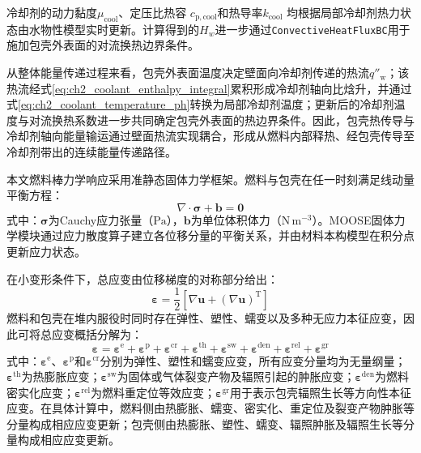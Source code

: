 冷却剂的动力黏度$\mu_{\mathrm{cool}}$、定压比热容
$c_{\mathrm p,\mathrm{cool}}$和热导率$k_{\mathrm{cool}}$
均根据局部冷却剂热力状态由水物性模型实时更新。计算得到的$H_w$进一步通过\texttt{ConvectiveHeatFluxBC}用于施加包壳外表面的对流换热边界条件。

从整体能量传递过程来看，包壳外表面温度决定壁面向冷却剂传递的热流$q''_{\mathrm w}$；该热流经式\eqref{eq:ch2_coolant_enthalpy_integral}累积形成冷却剂轴向比{\rarecharfont 焓}升，并通过式\eqref{eq:ch2_coolant_temperature_ph}转换为局部冷却剂温度；更新后的冷却剂温度与对流换热系数进一步共同确定包壳外表面的热边界条件。因此，包壳热传导与冷却剂轴向能量输运通过壁面热流实现耦合，形成从燃料内部释热、经包壳传导至冷却剂带出的连续能量传递路径。

\label{sec:ch2_mechanics_governing}


本文燃料棒力学响应采用准静态固体力学框架。燃料与包壳在任一时刻满足线动量平衡方程：
\begin{equation}
	\nabla\cdot\boldsymbol{\sigma}+\mathbf b=\mathbf 0
	\label{eq:ch2_quasistatic_equilibrium}
\end{equation}
\noindent 式中：$\boldsymbol{\sigma}$为Cauchy应力张量（$\mathrm{Pa}$），$\mathbf b$为单位体积体力（$\mathrm{N\,m^{-3}}$）。MOOSE固体力学模块通过应力散度算子建立各位移分量的平衡关系，并由材料本构模型在积分点更新应力状态\cite{halesBISONTheoryManual2016}。

在小变形条件下，总应变由位移梯度的对称部分给出：
\begin{equation}
	\boldsymbol{\varepsilon}
	=\frac{1}{2}
	\left[
		\nabla\mathbf u+\left(\nabla\mathbf u\right)^{\mathrm T}
		\right]
	\label{eq:ch2_small_strain}
\end{equation}
燃料和包壳在堆内服役时同时存在弹性、塑性、蠕变以及多种无应力本征应变，因此可将总应变概括分解为：
\begin{equation}
	\boldsymbol{\varepsilon}
	=\boldsymbol{\varepsilon}^{\mathrm{e}}
	+\boldsymbol{\varepsilon}^{\mathrm{p}}
	+\boldsymbol{\varepsilon}^{\mathrm{cr}}
	+\boldsymbol{\varepsilon}^{\mathrm{th}}
	+\boldsymbol{\varepsilon}^{\mathrm{sw}}
	+\boldsymbol{\varepsilon}^{\mathrm{den}}
	+\boldsymbol{\varepsilon}^{\mathrm{rel}}
	+\boldsymbol{\varepsilon}^{\mathrm{gr}}
	\label{eq:ch2_strain_decomposition}
\end{equation}
\noindent 式中：$\boldsymbol{\varepsilon}^{\mathrm{e}}$、$\boldsymbol{\varepsilon}^{\mathrm{p}}$和$\boldsymbol{\varepsilon}^{\mathrm{cr}}$分别为弹性、塑性和蠕变应变，所有应变分量均为无量纲量；$\boldsymbol{\varepsilon}^{\mathrm{th}}$为热膨胀应变；$\boldsymbol{\varepsilon}^{\mathrm{sw}}$为固体或气体裂变产物及辐照引起的肿胀应变；$\boldsymbol{\varepsilon}^{\mathrm{den}}$为燃料密实化应变；$\boldsymbol{\varepsilon}^{\mathrm{rel}}$为燃料重定位等效应变；$\boldsymbol{\varepsilon}^{\mathrm{gr}}$用于表示包壳辐照生长等方向性本征应变。在具体计算中，燃料侧由热膨胀、蠕变、密实化、重定位及裂变产物肿胀等分量构成相应应变更新；包壳侧由热膨胀、塑性、蠕变、辐照肿胀及辐照生长等分量构成相应应变更新。

